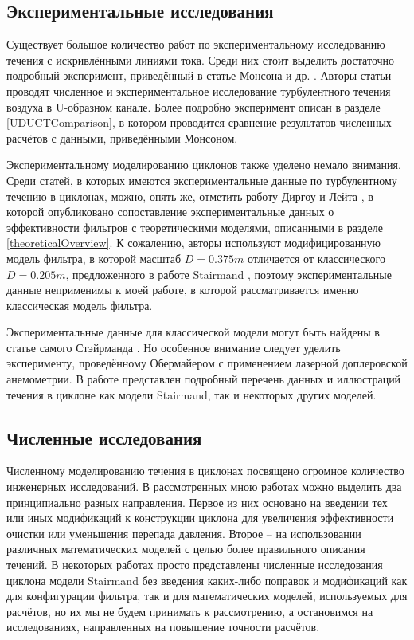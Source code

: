   
	\subsection{Экспериментальные исследования}
		\hspace{1em}Существует большое количество работ по экспериментальному исследованию течения с искривлёнными линиями тока. Среди них стоит выделить достаточно подробный эксперимент, приведённый в статье Монсона и др. \cite{Monson}. Авторы статьи проводят численное и экспериментальное исследование турбулентного течения воздуха в U-образном канале. Более подробно эксперимент описан в разделе \ref{UDUCTComparison}, в котором проводится сравнение результатов численных расчётов с данными, приведёнными Монсоном.
		
		Экспериментальному моделированию циклонов также уделено немало внимания. Среди статей, в которых имеются экспериментальные данные по турбулентному течению в циклонах, можно, опять же, отметить работу Диргоу и Лейта \cite{DirgoLeith}, в которой опубликовано сопоставление  экспериментальные данных о эффективности фильтров с теоретическими моделями, описанными в разделе \ref{theoreticalOverview}. К сожалению, авторы используют модифицированную модель фильтра, в которой масштаб $D = 0.375m$ отличается от классического $D = 0.205m$, предложенного в работе Stairmand \cite{Stairmand}, поэтому экспериментальные данные неприменимы к моей работе, в которой рассматривается именно классическая модель фильтра.
		
		Экспериментальные данные для классической модели могут быть найдены в статье самого Стэйрманда \cite{Stairmand}. Но особенное внимание следует уделить эксперименту, проведённому Обермайером \cite{Obermaier} с применением лазерной доплеровской анемометрии. В работе представлен подробный перечень данных и иллюстраций течения в циклоне как модели Stairmand, так и некоторых других моделей.
	\subsection{Численные исследования}
		\hspace{2em}Численному моделированию течения в циклонах посвящено огромное количество инженерных исследований. В рассмотренных мною работах можно выделить два принципиально разных направления. Первое из них основано на введении тех или иных модификаций к конструкции циклона для увеличения эффективности очистки или уменьшения перепада давления. Второе -- на использовании различных математических моделей с целью более правильного описания течений. В некоторых работах просто представлены численные исследования циклона модели Stairmand без введения каких-либо поправок и модификаций как для конфигурации фильтра, так и для математических моделей, используемых для расчётов, но их мы не будем принимать к рассмотрению, а остановимся на исследованиях, направленных на повышение точности расчётов.
		
